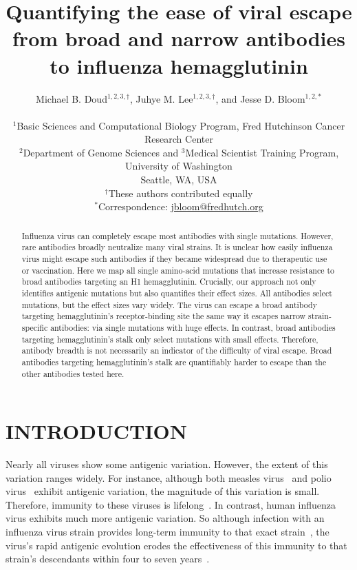 \documentclass[11pt]{article}
\title{Quantifying the ease of viral escape from broad and narrow antibodies to influenza hemagglutinin}
\author
{Michael B. Doud$^{1,2,3,\dagger}$, Juhye M. Lee$^{1,2,3,\dagger}$, and Jesse D. Bloom$^{1,2,*}$\\
\\
\scriptsize{$^1$Basic Sciences and Computational Biology Program, Fred Hutchinson Cancer Research Center}\\
\scriptsize{$^2$Department of Genome Sciences and $^3$Medical Scientist Training Program, University of Washington} \\
\scriptsize{Seattle, WA, USA} \\
\scriptsize{$^{\dagger}$These authors contributed equally} \\
\scriptsize{$^*$Correspondence: \href{jbloom@fredhutch.org}{jbloom@fredhutch.org}}
}
\date{}
\begin{document}
\maketitle
\onehalfspacing

\begin{abstract}
Influenza virus can completely escape most antibodies with single mutations.
However, rare antibodies broadly neutralize many viral strains.
It is unclear how easily influenza virus might escape such antibodies if they became widespread due to therapeutic use or vaccination.
Here we map all single amino-acid mutations that increase resistance to broad antibodies targeting an H1 hemagglutinin.
Crucially, our approach not only identifies antigenic mutations but also quantifies their effect sizes.
All antibodies select mutations, but the effect sizes vary widely. 
The virus can escape a broad antibody targeting hemagglutinin's receptor-binding site the same way it escapes narrow strain-specific antibodies: via single mutations with huge effects.   
In contrast, broad antibodies targeting hemagglutinin's stalk only select mutations with small effects. 
Therefore, antibody breadth is not necessarily an indicator of the difficulty of viral escape.
Broad antibodies targeting hemagglutinin's stalk are quantifiably harder to escape than the other antibodies tested here.
\end{abstract}

\section*{INTRODUCTION}
Nearly all viruses show some antigenic variation.
However, the extent of this variation ranges widely.
For instance, although both measles virus~\citep{birrer1981antigenic,ter1981antigenic} and polio virus~\citep{crainic1983natural,diamond1985antigenic,drexler2014robustness} exhibit antigenic variation, the magnitude of this variation is small. 
Therefore, immunity to these viruses is lifelong~\citep{panum1847iagttagelser,salk1984one}.
In contrast, human influenza virus exhibits much more antigenic variation.
So although infection with an influenza virus strain provides long-term immunity to that exact strain~\citep{davies1982christ,yu2008neutralizing}, the virus's rapid antigenic evolution erodes the effectiveness of this immunity to that strain's descendants within four to seven years~\citep{couch1983immunity}.
\end{document}

